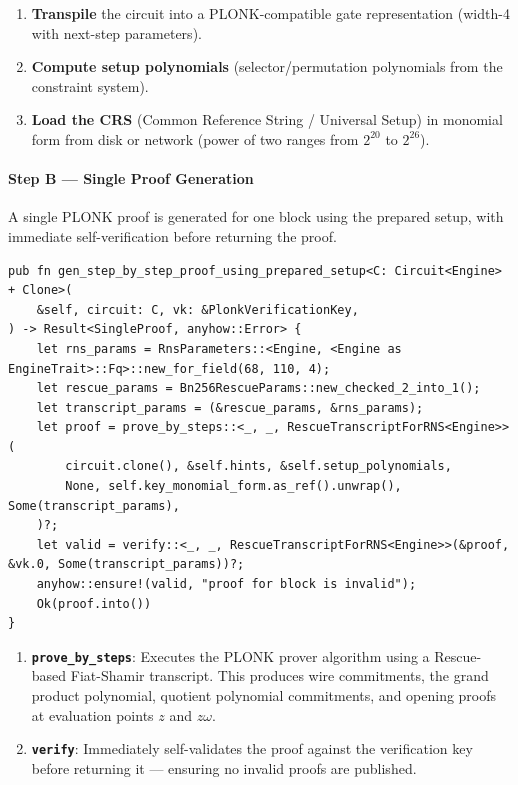 \begin{enumerate}
    \item \textbf{Transpile} the circuit into a PLONK-compatible gate representation (width-4 with next-step parameters).
    \item \textbf{Compute setup polynomials} (selector/permutation polynomials from the constraint system).
    \item \textbf{Load the CRS} (Common Reference String / Universal Setup) in monomial form from disk or network (power of two ranges from $2^{20}$ to $2^{26}$).
\end{enumerate}

\paragraph{Step B --- Single Proof Generation}

A single PLONK proof is generated for one block using the prepared setup, with immediate self-verification before returning the proof.

\begin{lstlisting}[caption={Single proof generation from \texttt{core/lib/prover\_utils/src/lib.rs}}]
pub fn gen_step_by_step_proof_using_prepared_setup<C: Circuit<Engine> + Clone>(
    &self, circuit: C, vk: &PlonkVerificationKey,
) -> Result<SingleProof, anyhow::Error> {
    let rns_params = RnsParameters::<Engine, <Engine as EngineTrait>::Fq>::new_for_field(68, 110, 4);
    let rescue_params = Bn256RescueParams::new_checked_2_into_1();
    let transcript_params = (&rescue_params, &rns_params);
    let proof = prove_by_steps::<_, _, RescueTranscriptForRNS<Engine>>(
        circuit.clone(), &self.hints, &self.setup_polynomials,
        None, self.key_monomial_form.as_ref().unwrap(), Some(transcript_params),
    )?;
    let valid = verify::<_, _, RescueTranscriptForRNS<Engine>>(&proof, &vk.0, Some(transcript_params))?;
    anyhow::ensure!(valid, "proof for block is invalid");
    Ok(proof.into())
}
\end{lstlisting}

\begin{enumerate}
    \item \textbf{\texttt{prove\_by\_steps}}: Executes the PLONK prover algorithm using a Rescue-based Fiat-Shamir transcript. This produces wire commitments, the grand product polynomial, quotient polynomial commitments, and opening proofs at evaluation points $z$ and $z\omega$.
    \item \textbf{\texttt{verify}}: Immediately self-validates the proof against the verification key before returning it --- ensuring no invalid proofs are published.
\end{enumerate}

